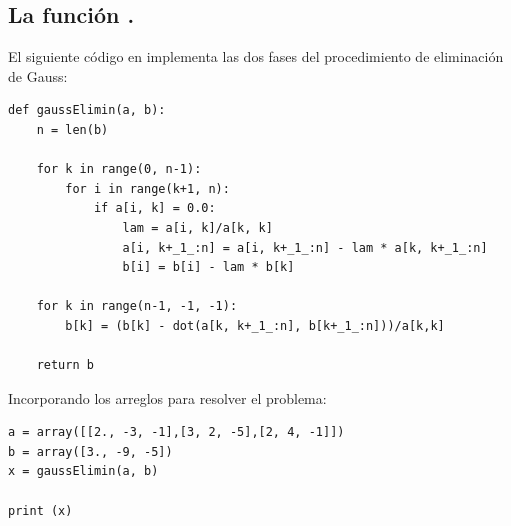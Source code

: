 \subsection{La función .}
El siguiente código en \python{} implementa las dos fases del procedimiento de eliminación de Gauss:
\begin{lstlisting}[caption=Función gaussElimin, style=FormattedNumber, basicstyle=\linespread{1.1}\ttfamily=\small, columns=fullflexible]
def gaussElimin(a, b):
    n = len(b)

    for k in range(0, n-1):
        for i in range(k+1, n):
            if a[i, k] = 0.0:
                lam = a[i, k]/a[k, k]
                a[i, k+_1_:n] = a[i, k+_1_:n] - lam * a[k, k+_1_:n]
                b[i] = b[i] - lam * b[k]

    for k in range(n-1, -1, -1):
        b[k] = (b[k] - dot(a[k, k+_1_:n], b[k+_1_:n]))/a[k,k]
    
    return b
\end{lstlisting}
Incorporando los arreglos para resolver el problema:
\begin{lstlisting}[caption=Agregando los arreglos, style=FormattedNumber, basicstyle=\linespread{1.1}\ttfamily=\small, columns=fullflexible]
a = array([[2., -3, -1],[3, 2, -5],[2, 4, -1]])
b = array([3., -9, -5])
x = gaussElimin(a, b)

print (x)
\end{lstlisting}
